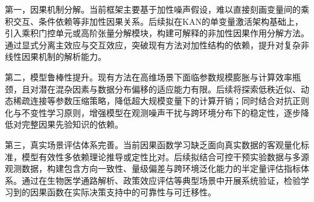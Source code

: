 第一，因果机制分解。当前框架主要基于加性噪声假设，难以直接刻画变量间的乘积交互、条件依赖等非加性因果关系。后续拟在KAN的单变量激活架构基础上，引入乘积门控单元或高阶张量分解模块，构建可解释的非加性因果作用分解方法。通过显式分离主效应与交互效应，突破现有方法对加性结构的依赖，提升对复杂非线性因果机制的解析能力。

第二，模型鲁棒性提升。现有方法在高维场景下面临参数规模膨胀与计算效率瓶颈，且对潜在混杂因素与数据分布偏移的适应能力有限。后续将探索低秩近似、动态稀疏连接等参数压缩策略，降低超大规模变量下的计算开销；同时结合对抗正则化与不变性学习原则，增强模型在观测噪声干扰与跨环境分布下的稳定性，逐步降低对完整因果先验知识的依赖。

第三，真实场景评估体系完善。当前因果函数学习缺乏面向真实数据的客观量化标准，模型有效性多依赖理论推导或定性比对。后续拟结合可控干预实验数据与多源观测数据，构建包含方向一致性、量级偏差与跨环境泛化能力的半定量评估指标体系。通过在生物医学通路解析、政策效应评估等典型场景中开展系统验证，检验学习到的因果函数在实际决策支持中的可靠性与可迁移性。